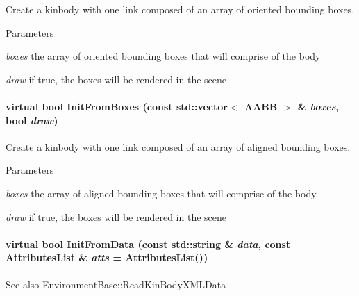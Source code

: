 Create a kinbody with one link composed of an array of oriented bounding boxes. 


\begin{DoxyParams}{Parameters}
\item[{\em boxes}]the array of oriented bounding boxes that will comprise of the body \item[{\em draw}]if true, the boxes will be rendered in the scene \end{DoxyParams}
\hypertarget{classOpenRAVE_1_1KinBody_a6ca8a1abee1479424de9c296da9cdd34}{
\paragraph[{InitFromBoxes}]{\setlength{\rightskip}{0pt plus 5cm}virtual bool InitFromBoxes (const std::vector$<$ {\bf AABB} $>$ \& {\em boxes}, \/  bool {\em draw})}\hfill}
\label{classOpenRAVE_1_1KinBody_a6ca8a1abee1479424de9c296da9cdd34}


Create a kinbody with one link composed of an array of aligned bounding boxes. 


\begin{DoxyParams}{Parameters}
\item[{\em boxes}]the array of aligned bounding boxes that will comprise of the body \item[{\em draw}]if true, the boxes will be rendered in the scene \end{DoxyParams}
\hypertarget{classOpenRAVE_1_1KinBody_a3f81f529c6959894555ad8841a134431}{
\paragraph[{InitFromData}]{\setlength{\rightskip}{0pt plus 5cm}virtual bool InitFromData (const std::string \& {\em data}, \/  const AttributesList \& {\em atts} = {\ttfamily AttributesList()})}\hfill}
\label{classOpenRAVE_1_1KinBody_a3f81f529c6959894555ad8841a134431}
\begin{DoxySeeAlso}{See also}
EnvironmentBase::ReadKinBodyXMLData 
\end{DoxySeeAlso}


